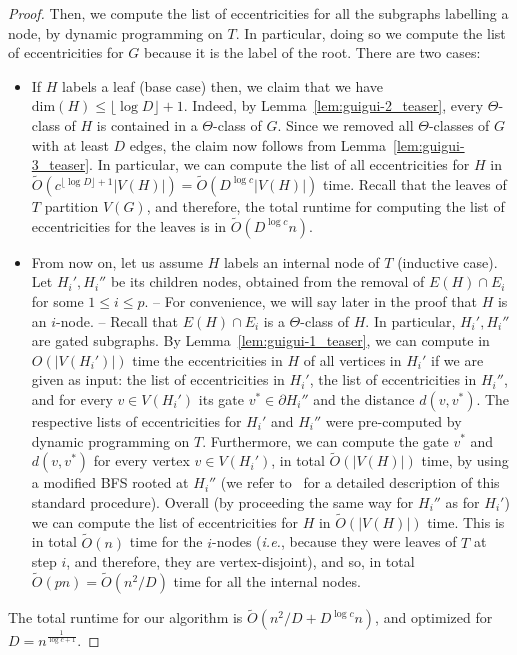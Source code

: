 \documentclass[a4paper,UKenglish,numberwithinsect,cleveref, autoref]{lipics-v2021}
\begin{document}
\begin{proof}
Then, we compute the list of eccentricities for all the subgraphs labelling a node, by dynamic programming on $T$. 
In particular, doing so we compute the list of eccentricities for $G$ because it is the label of the root.
There are two cases:
\begin{itemize}
    \item If $H$ labels a leaf (base case) then, we claim that we have $\mbox{dim}(H) \leq \lfloor \log{D} \rfloor + 1$.
Indeed, by Lemma~\ref{lem:guigui-2_teaser}, every $\Theta$-class of $H$ is contained in a $\Theta$-class of $G$.
Since we removed all $\Theta$-classes of $G$ with at least $D$ edges, the claim now follows from Lemma~\ref{lem:guigui-3_teaser}.
In particular, we can compute the list of all eccentricities for $H$ in $\tilde{O}(c^{\lfloor \log{D} \rfloor + 1}|V(H)|) = \tilde{O}(D^{\log{c}}|V(H)|)$ time.
Recall that the leaves of $T$ partition $V(G)$, and therefore, the total runtime for computing the list of eccentricities for the leaves is in $\tilde{O}(D^{\log{c}}n)$.
    \item From now on, let us assume $H$ labels an internal node of $T$ (inductive case).
Let $H_i',H_i''$ be its children nodes, obtained from the removal of $E(H) \cap E_i$ for some $1 \leq i \leq p$.
-- For convenience, we will say later in the proof that $H$ is an $i$-node. --
Recall that $E(H) \cap E_i$ is a $\Theta$-class of $H$.
In particular, $H_i',H_i''$ are gated subgraphs.
By Lemma~\ref{lem:guigui-1_teaser}, we can compute in ${O}(|V(H_i')|)$ time the eccentricities in $H$ of all vertices in $H_i'$ if we are given as input: the list of eccentricities in $H_i'$, the list of eccentricities in $H_i''$, and for every $v \in V(H_i')$ its gate $v^* \in \partial H_i''$ and the distance $d(v,v^*)$. 
The respective lists of eccentricities for $H_i'$ and $H_i''$ were pre-computed by dynamic programming on $T$.
Furthermore, we can compute the gate $v^*$ and $d(v,v^*)$ for every vertex $v \in V(H_i')$, in total $\tilde{O}(|V(H)|)$ time, by using a modified BFS rooted at $H_i''$ (we refer to~\cite[Lemma 17]{ChLaRa19} for a detailed description of this standard procedure).
Overall (by proceeding the same way for $H_i''$ as for $H_i'$) we can compute the list of eccentricities for $H$ in $\tilde{O}(|V(H)|)$ time.
This is in total $\tilde{O}(n)$ time for the $i$-nodes ({\it i.e.}, because they were leaves of $T$ at step $i$, and therefore, they are vertex-disjoint), and so, in total $\tilde{O}(pn) = \tilde{ O}(n^2/D)$ time for all the internal nodes.
\end{itemize}
The total runtime for our algorithm is $\tilde{O}(n^2/D + D^{\log{c}}n)$, and optimized for $D = n^{\frac 1 {\log{c}+1}}$.
\end{proof}
\end{document}
